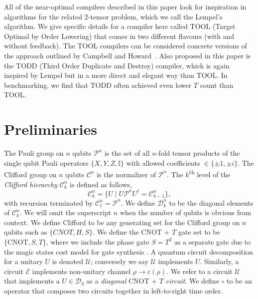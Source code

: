 \documentclass[notitlepage]{article}
\theoremstyle{definition}
\theoremstyle{problem}
\theoremstyle{lemma}
\begin{document}
		All of the near-optimal compilers described in this paper look for inspiration in algorithms for the related 2-tensor problem, which we call the Lempel's algorithm.  We give specific details for a compiler here called TOOL (Target Optimal by Order Lowering) that comes in two different flavours (with and without feedback).  The TOOL compilers can be considered concrete versions of the approach outlined by Campbell and Howard~\cite{campbell17b}.  Also proposed in this paper is the TODD (Third Order Duplicate and Destroy) compiler, which is again inspired by Lempel but in a more direct and elegant way than TOOL.  In benchmarking, we find that TODD often achieved even lower $T$ count than TOOL.  
		
	\FloatBarrier
	
	\section{Preliminaries}	
	The Pauli group on $n$ qubits $\mathcal{P}^n$ is the set of all $n$-fold tensor products of the single qubit Pauli operators $\{X, Y, Z, \mathbb{I}\}$ with allowed coefficients $\in \{\pm1,\pm i\}$.
	The Clifford group on $n$ qubits $\mathcal{C}^n$ is the normalizer of $\mathcal{P}^n$.
	The $k$\textsuperscript{th} level of the \emph{Clifford hierarchy} $\mathcal{C}_k^n$ is defined as follows,
	\begin{equation}
	\label{e_heir}
	\mathcal{C}_k^n = \{U \mid U\mathcal{P}^n U^\dagger = \mathcal{C}_{k-1}^n\},
	\end{equation}
	with recursion terminated by $\mathcal{C}^n_1 = \mathcal{P}^n$.
	We define $\mathcal{D}_k^n$ to be the diagonal elements of $\mathcal{C}_k^n$. We will omit the superscript $n$ when the number of qubits is obvious from context.
	We define Clifford to be any generating set for the Clifford group on $n$ qubits such as $\{CNOT,H,S\}$.
	We define the CNOT + $T$ gate set to be $\{\mathrm{CNOT}, S, T\}$, where we include the phase gate $S=T^2$ as a separate gate due to the magic states cost model for gate synthesis \cite{BraKit05}.
	A quantum circuit decomposition for a unitary $U$ is denoted $\mathcal{U}$; conversely we say $\mathcal{U}$ implements $U$. Similarly, a circuit $\mathcal{E}$ implements non-unitary channel $\rho \rightarrow \varepsilon(\rho)$. We refer to a circuit $\mathcal{U}$ that implements a $U\in \mathcal{D}_3$ as a \emph{diagonal} CNOT + $T$ \emph{circuit}. We define $\circ$ to be an operator that composes two circuits together in left-to-right time order.
	
\end{document}
